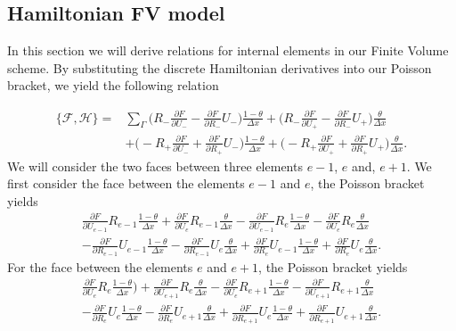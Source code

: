 \documentclass[a4paper,11pt]{article}
\begin{document}
\subsection{Hamiltonian FV model}
 In this section we will derive relations for internal elements in our Finite Volume scheme. By substituting the discrete Hamiltonian derivatives into our Poisson bracket, we yield the following relation
 
  \begin{equation}
\begin{aligned}
 \{ \mathcal{F},  \mathcal{H}\} = & \sum_\Gamma \bigg ( R_-\frac{\partial F}{\partial U_-} - \frac{\partial F}{\partial R_-} U_-\bigg  ) \frac{1-\theta}{\Delta x} +  \bigg  ( R_-\frac{\partial F}{\partial U_+} - \frac{\partial F}{\partial R_-} U_+\bigg  ) \frac{\theta}{\Delta x}\\
 & + \bigg  ( -  R_+\frac{\partial F}{\partial U_-} + \frac{\partial F}{\partial R_+} U_-\bigg  ) \frac{1-\theta}{\Delta x} + \bigg  ( -  R_+\frac{\partial F}{\partial U_+} + \frac{\partial F}{\partial R_+}U_+\bigg  )\frac{\theta}{\Delta x}.
 \end{aligned}
 \end{equation}
We will consider the two faces between three elements $e-1$, $e$ and, $e+ 1$. We first consider the face between the elements  $e-1$ and  $e$, the Poisson bracket yields
\begin{equation}
\begin{aligned}
\frac{\partial F}{\partial U_{e-1}}R_{e-1}\frac{1-\theta}{\Delta x}  + \frac{\partial F}{\partial U_{e}}R_{e-1} \frac{\theta}{\Delta x} - \frac{\partial F}{\partial U_{e-1}}R_{e}\frac{1-\theta}{\Delta x}  -\frac{\partial F}{\partial U_{e}}R_{e} \frac{\theta}{\Delta x}\\
-\frac{\partial F}{\partial R_{e-1}}U_{e-1}\frac{1-\theta}{\Delta x}  -\frac{\partial F}{\partial R_{e-1}}U_{e} \frac{\theta}{\Delta x} +\frac{\partial F}{\partial R_{e}}U_{e-1}\frac{1-\theta}{\Delta x}  +\frac{\partial F}{\partial R_{e}}U_{e} \frac{\theta}{\Delta x}.
\end{aligned}
\end{equation}
For the face between the elements  $e$ and  $e+1$, the Poisson bracket yields
\begin{equation}
\begin{aligned}
\frac{\partial F}{\partial U_{e}}R_{e}\frac{1-\theta}{\Delta x} ) + \frac{\partial F}{\partial U_{e+1}}R_{e} \frac{\theta}{\Delta x} - \frac{\partial F}{\partial U_{e}}R_{e+1}\frac{1-\theta}{\Delta x}  -\frac{\partial F}{\partial U_{e+1}}R_{e+1} \frac{\theta}{\Delta x}\\
-\frac{\partial F}{\partial R_{e}}U_{e}\frac{1-\theta}{\Delta x}  -\frac{\partial F}{\partial R_{e}}U_{e+1} \frac{\theta}{\Delta x}+\frac{\partial F}{\partial R_{e+1}}U_{e}\frac{1-\theta}{\Delta x}  +\frac{\partial F}{\partial R_{e+1}}U_{e+1} \frac{\theta}{\Delta x}.
\end{aligned}
\end{equation}
\end{document}
